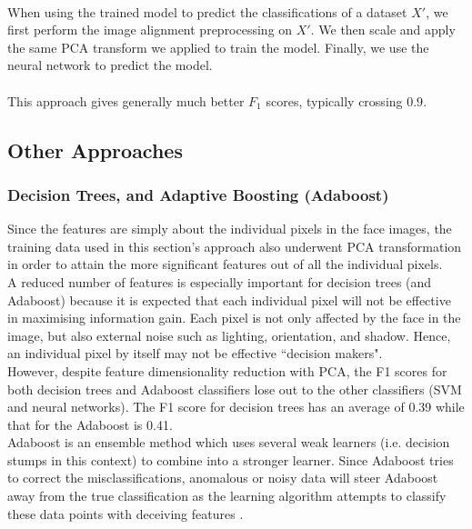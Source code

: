 \documentclass{article}
\begin{document}
\paragraph{}
When using the trained model to predict the classifications of a dataset $X'$, we first perform the image alignment preprocessing on $X'$. We then scale and apply the same PCA transform we applied to train the model. Finally, we use the neural network to predict the model.

\paragraph{}
This approach gives generally much better $F_1$ scores, typically crossing $0.9$.
\newpage

\subsection{Other Approaches}
\subsubsection{Decision Trees, and Adaptive Boosting (Adaboost)}
Since the features are simply about the individual pixels in the face images, the training data used in this section's approach also underwent PCA transformation in order to attain the more significant features out of all the individual pixels. \\

A reduced number of features is especially important for decision trees (and Adaboost) because it is expected that each individual pixel will not be effective in maximising information gain. Each pixel is not only affected by the face in the image, but also external noise such as lighting, orientation, and shadow. Hence, an individual pixel by itself may not be effective ``decision makers". \\

However, despite feature dimensionality reduction with PCA, the F1 scores for both decision trees and Adaboost classifiers lose out to the other classifiers (SVM and neural networks). The F1 score for decision trees has an average of 0.39 while that for the Adaboost is 0.41. \\

Adaboost is an ensemble method which uses several weak learners (i.e. decision stumps in this context) to combine into a stronger learner. Since Adaboost tries to correct the misclassifications, anomalous or noisy data will steer Adaboost away from the true classification as the learning algorithm attempts to classify these data points with deceiving features \cite{bib-02}. \\
\end{document}
